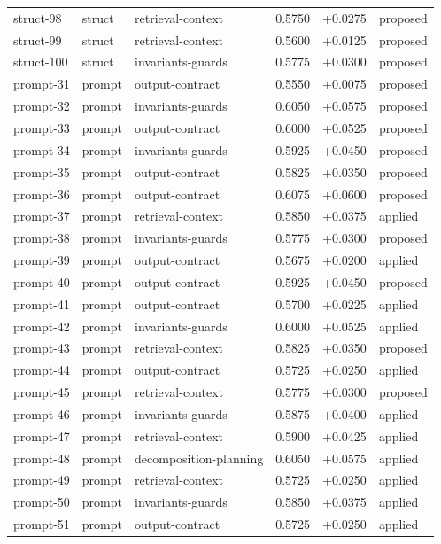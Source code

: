 \begin{center}
\begin{longtable}{llp{5.2cm}rrl}
struct-98 & struct & retrieval-context & 0.5750 & +0.0275 & proposed \\
struct-99 & struct & retrieval-context & 0.5600 & +0.0125 & proposed \\
struct-100 & struct & invariants-guards & 0.5775 & +0.0300 & proposed \\
prompt-31 & prompt & output-contract & 0.5550 & +0.0075 & proposed \\
prompt-32 & prompt & invariants-guards & 0.6050 & +0.0575 & proposed \\
prompt-33 & prompt & output-contract & 0.6000 & +0.0525 & proposed \\
prompt-34 & prompt & invariants-guards & 0.5925 & +0.0450 & proposed \\
prompt-35 & prompt & output-contract & 0.5825 & +0.0350 & proposed \\
prompt-36 & prompt & output-contract & 0.6075 & +0.0600 & proposed \\
prompt-37 & prompt & retrieval-context & 0.5850 & +0.0375 & applied \\
prompt-38 & prompt & invariants-guards & 0.5775 & +0.0300 & proposed \\
prompt-39 & prompt & output-contract & 0.5675 & +0.0200 & applied \\
prompt-40 & prompt & output-contract & 0.5925 & +0.0450 & proposed \\
prompt-41 & prompt & output-contract & 0.5700 & +0.0225 & applied \\
prompt-42 & prompt & invariants-guards & 0.6000 & +0.0525 & applied \\
prompt-43 & prompt & retrieval-context & 0.5825 & +0.0350 & proposed \\
prompt-44 & prompt & output-contract & 0.5725 & +0.0250 & applied \\
prompt-45 & prompt & retrieval-context & 0.5775 & +0.0300 & proposed \\
prompt-46 & prompt & invariants-guards & 0.5875 & +0.0400 & applied \\
prompt-47 & prompt & retrieval-context & 0.5900 & +0.0425 & applied \\
prompt-48 & prompt & decomposition-planning & 0.6050 & +0.0575 & applied \\
prompt-49 & prompt & retrieval-context & 0.5725 & +0.0250 & applied \\
prompt-50 & prompt & invariants-guards & 0.5850 & +0.0375 & applied \\
prompt-51 & prompt & output-contract & 0.5725 & +0.0250 & applied \\

\end{longtable}
\end{center}
